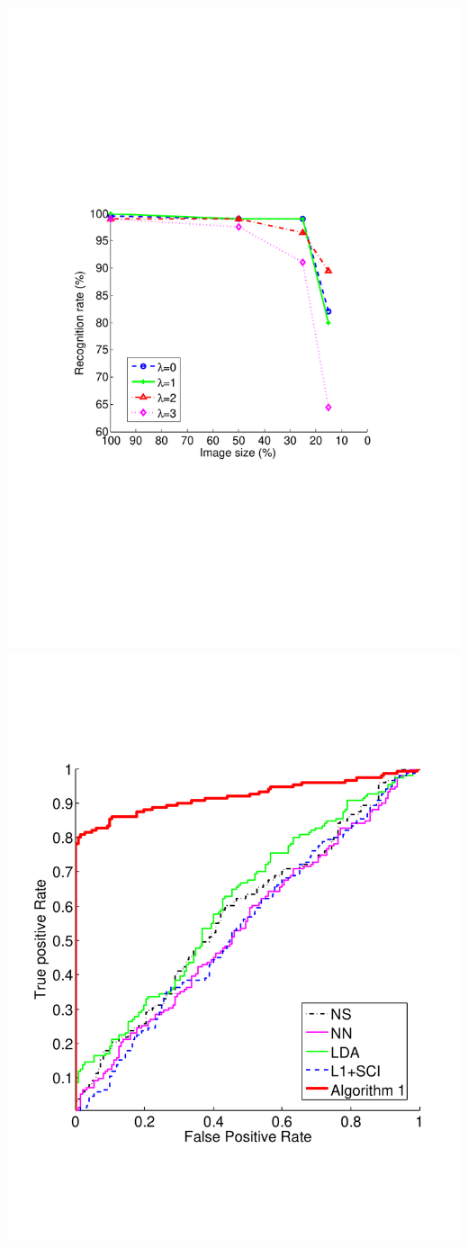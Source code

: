 {\begin{columns}
\begin{column}{.33\textwidth}
\begin{center}
\includegraphics[width= .9\textwidth]{figures_iccv/results/AR_sunglasses_new.pdf}\\
\vspace{-.1in}{\tiny Sunglasses}
\includegraphics[width=.9\textwidth]{figures_iccv/roc/eYB-80.pdf}\\

\end{center}
\end{column}
\end{columns}}
